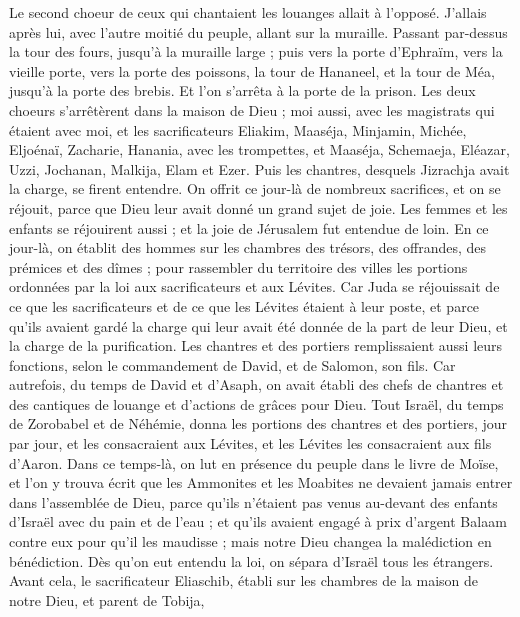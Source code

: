 \begin{multicols}{2}
Le second choeur de ceux qui chantaient les louanges allait à l'opposé. J'allais après lui, avec l'autre moitié du peuple, allant sur la muraille. Passant par-dessus la tour des fours, jusqu'à la muraille large ;
puis vers la porte d'Ephraïm, vers la vieille porte, vers la porte des poissons, la tour de Hananeel, et la tour de Méa, jusqu'à la porte des brebis. Et l'on s'arrêta à la porte de la prison.
Les deux choeurs s'arrêtèrent dans la maison de Dieu ; moi aussi, avec les magistrats qui étaient avec moi,
et les sacrificateurs Eliakim, Maaséja, Minjamin, Michée, Eljoénaï, Zacharie, Hanania, avec les trompettes,
et Maaséja, Schemaeja, Eléazar, Uzzi, Jochanan, Malkija, Elam et Ezer. Puis les chantres, desquels Jizrachja avait la charge, se firent entendre.
On offrit ce jour-là de nombreux sacrifices, et on se réjouit, parce que Dieu leur avait donné un grand sujet de joie. Les femmes et les enfants se réjouirent aussi ; et la joie de Jérusalem fut entendue de loin.
En ce jour-là, on établit des hommes sur les chambres des trésors, des offrandes, des prémices et des dîmes ; pour rassembler du territoire des villes les portions ordonnées par la loi aux sacrificateurs et aux Lévites. Car Juda se réjouissait de ce que les sacrificateurs et  de ce que les Lévites étaient à leur poste,
et parce qu'ils avaient gardé la charge qui leur avait été donnée de la part de leur Dieu, et la charge de la purification. Les chantres et des portiers remplissaient aussi leurs fonctions, selon le commandement de David, et de Salomon, son fils.
Car autrefois, du temps de David et d'Asaph, on avait établi des chefs de chantres et des cantiques de louange et d'actions de grâces pour Dieu.
Tout Israël, du temps de Zorobabel et de Néhémie, donna les portions des chantres et des portiers, jour par jour, et les consacraient aux Lévites, et les Lévites les consacraient aux fils d'Aaron.
\VerseOne{}Dans ce temps-là, on lut en présence du peuple dans le livre de Moïse, et l’on y trouva écrit que les Ammonites et les Moabites ne devaient jamais  entrer dans l'assemblée de Dieu,
parce qu'ils n'étaient pas venus au-devant des enfants d'Israël avec du pain et de l'eau ; et qu'ils avaient engagé à prix d’argent Balaam  contre eux pour qu'il les maudisse ; mais notre Dieu changea la malédiction en bénédiction.
Dès qu'on eut entendu la loi, on sépara d'Israël tous les étrangers.
Avant cela, le sacrificateur Eliaschib, établi sur les chambres de la maison de notre Dieu, et parent de Tobija,

\end{multicols}
